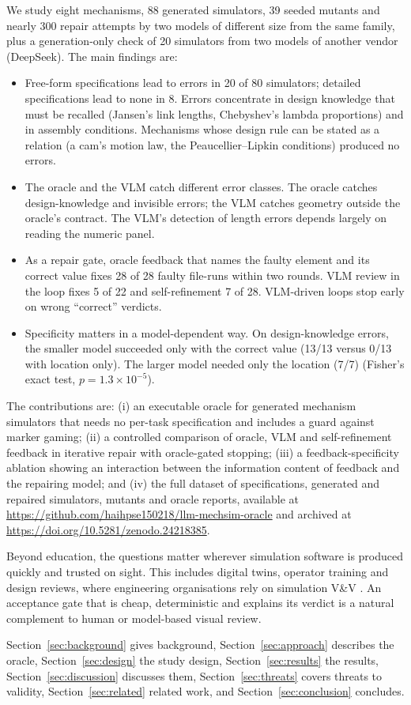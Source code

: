 We study eight mechanisms, 88 generated simulators, 39 seeded mutants and nearly 300 repair attempts by two models of different size from the same family, plus a generation-only check of 20 simulators from two models of another vendor (DeepSeek). The main findings are:
\begin{itemize}
\item Free-form specifications lead to errors in 20 of 80 simulators; detailed specifications lead to none in 8. Errors concentrate in design knowledge that must be recalled (Jansen's link lengths, Chebyshev's lambda proportions) and in assembly conditions. Mechanisms whose design rule can be stated as a relation (a cam's motion law, the Peaucellier--Lipkin conditions) produced no errors.
\item The oracle and the VLM catch different error classes. The oracle catches design-knowledge and invisible errors; the VLM catches geometry outside the oracle's contract. The VLM's detection of length errors depends largely on reading the numeric panel.
\item As a repair gate, oracle feedback that names the faulty element and its correct value fixes 28 of 28 faulty file-runs within two rounds. VLM review in the loop fixes 5 of 22 and self-refinement 7 of 28. VLM-driven loops stop early on wrong ``correct'' verdicts.
\item Specificity matters in a model-dependent way. On design-knowledge errors, the smaller model succeeded only with the correct value (13/13 versus 0/13 with location only). The larger model needed only the location (7/7) (Fisher's exact test, $p = 1.3\times10^{-5}$).
\end{itemize}

The contributions are: (i) an executable oracle for generated mechanism simulators that needs no per-task specification and includes a guard against marker gaming; (ii) a controlled comparison of oracle, VLM and self-refinement feedback in iterative repair with oracle-gated stopping; (iii) a feedback-specificity ablation showing an interaction between the information content of feedback and the repairing model; and (iv) the full dataset of specifications, generated and repaired simulators, mutants and oracle reports, available at \url{https://github.com/haihpse150218/llm-mechsim-oracle} and archived at \url{https://doi.org/10.5281/zenodo.24218385}.

Beyond education, the questions matter wherever simulation software is produced quickly and trusted on sight. This includes digital twins, operator training and design reviews, where engineering organisations rely on simulation V\&V \citep{sargent2013vv,balci1997vva}. An acceptance gate that is cheap, deterministic and explains its verdict is a natural complement to human or model-based visual review.

Section~\ref{sec:background} gives background, Section~\ref{sec:approach} describes the oracle, Section~\ref{sec:design} the study design, Section~\ref{sec:results} the results, Section~\ref{sec:discussion} discusses them, Section~\ref{sec:threats} covers threats to validity, Section~\ref{sec:related} related work, and Section~\ref{sec:conclusion} concludes.
